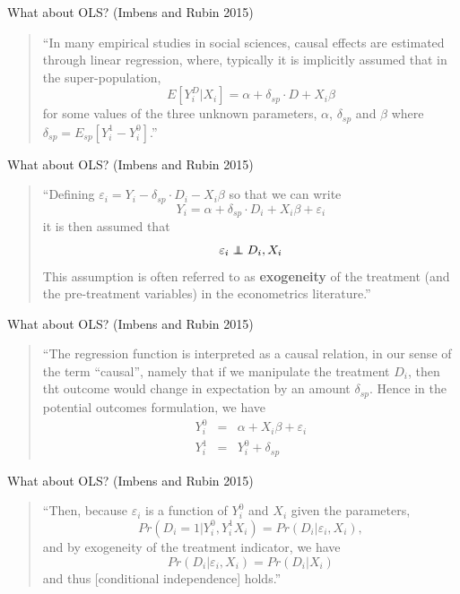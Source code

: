 \documentclass{beamer}
\newcommand\independent{\protect\mathpalette{\protect\independenT}{\perp}}
\def\independenT#1#2{\mathrel{\rlap{$#1#2$}\mkern2mu{#1#2}}}
\begin{document}
\begin{frame}{What about OLS?  (Imbens and Rubin 2015)}

	\begin{quote} 
	``In many empirical studies in social sciences, causal effects are estimated through linear regression, where, typically it is implicitly assumed that in the super-population, $$E[Y_i^D | X_i] = \alpha + \delta_{sp} \cdot D + X_i \beta$$ for some values of the three unknown parameters, $\alpha$, $\delta_{sp}$ and $\beta$ where $\delta_{sp} = E_{sp} [ Y_i^1 - Y_i^0]$.''
	\end{quote}
	
\end{frame}

\begin{frame}{What about OLS?  (Imbens and Rubin 2015)}

\begin{quote}
``Defining $\varepsilon_i = Y_i - \delta_{sp} \cdot D_i - X_i \beta$ so that we can write $$Y_i = \alpha + \delta_{sp} \cdot D_i + X_i \beta  + \varepsilon_i$$ it is then assumed that $$\varepsilon_i \independent D_i, X_i$$This assumption is often referred to as \textbf{exogeneity} of the treatment (and the pre-treatment variables) in the econometrics literature.''

\end{quote}

\end{frame}

\begin{frame}{What about OLS?  (Imbens and Rubin 2015)}

\begin{quote}
``The regression function is interpreted as a causal relation, in our sense of the term ``causal'', namely that if we manipulate the treatment $D_i$, then tht outcome would change in expectation by an amount $\delta_{sp}$.  Hence in the potential outcomes formulation, we have 
\begin{eqnarray*}
Y_i^0 &=& \alpha + X_i \beta + \varepsilon_i \\ 
Y_i^1 &=& Y_i^0 + \delta_{sp}
\end{eqnarray*} 

\end{quote}
	
\end{frame}

\begin{frame}{What about OLS?  (Imbens and Rubin 2015)}

\begin{quote}
``Then, because $\varepsilon_i$ is a function of $Y^0_i$ and $X_i$ given the parameters, $$Pr(D_i=1 | Y_i^0, Y_i^1 X_i ) = Pr(D_i | \varepsilon_i, X_i),$$ and by exogeneity of the treatment indicator, we have $$Pr(D_i|\varepsilon_i, X_i) = Pr(D_i | X_i)$$ and thus [conditional independence] holds.'' 
\end{quote}

\end{frame}
\end{document}
